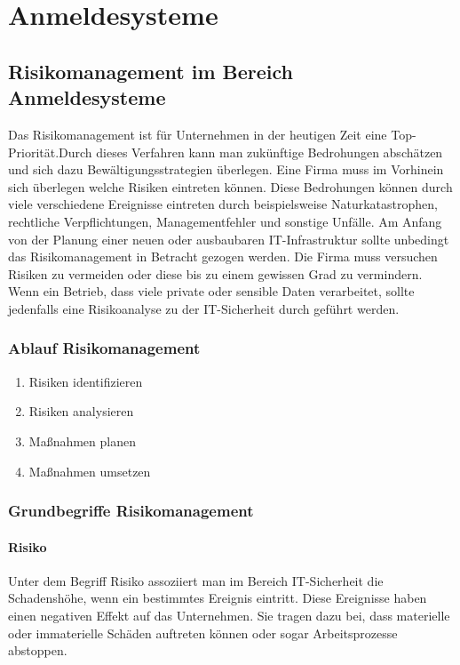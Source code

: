 \chapter{Anmeldesysteme}
\strahlhofer

\section{Risikomanagement im Bereich Anmeldesysteme}
Das Risikomanagement ist für Unternehmen in der heutigen Zeit eine Top-Priorität.Durch dieses Verfahren kann man zukünftige Bedrohungen abschätzen und sich dazu Bewältigungsstrategien überlegen. Eine Firma muss im Vorhinein sich überlegen welche Risiken eintreten können. Diese Bedrohungen können durch viele verschiedene Ereignisse eintreten durch beispielsweise Naturkatastrophen, rechtliche Verpflichtungen, Managementfehler und sonstige Unfälle.
Am Anfang von der Planung einer neuen oder ausbaubaren IT-Infrastruktur sollte unbedingt das Risikomanagement in Betracht gezogen werden. Die Firma muss versuchen Risiken zu vermeiden oder diese bis zu einem gewissen Grad zu vermindern. Wenn ein Betrieb, dass viele private oder sensible Daten verarbeitet, sollte jedenfalls eine Risikoanalyse zu der IT-Sicherheit durch geführt werden. 
\newpage

\subsection{Ablauf Risikomanagement}
\begin{enumerate}
    \item Risiken identifizieren
    \item Risiken analysieren
    \item Maßnahmen planen
    \item Maßnahmen umsetzen
\end{enumerate}


\subsection{Grundbegriffe Risikomanagement}
\subsubsection{Risiko}
Unter dem Begriff Risiko assoziiert man im Bereich IT-Sicherheit die Schadenshöhe, wenn ein bestimmtes Ereignis eintritt. Diese Ereignisse haben einen negativen Effekt auf das Unternehmen. Sie tragen dazu bei, dass materielle oder immaterielle Schäden auftreten können oder sogar Arbeitsprozesse abstoppen.
\\

